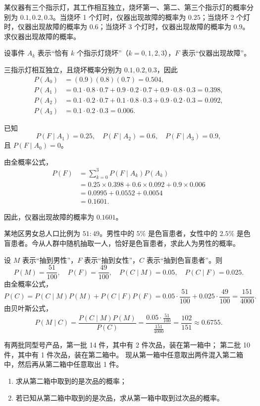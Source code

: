 \begin{exercise}
某仪器有三个指示灯，其工作相互独立，烧坏第一、第二、第三个指示灯的概率分别为 $0.1,0.2,0.3$。当烧坏 1 个灯时，仪器出现故障的概率为 $0.25$；当烧坏 2 个灯时，仪器出现故障的概率为 $0.6$；当烧坏 3 个灯时，仪器出现故障的概率为 $0.9$。求仪器出现故障的概率。
\end{exercise}
\begin{solution}
设事件 $A_k$ 表示“恰有 $k$ 个指示灯烧坏”（$k=0,1,2,3$），$F$ 表示“仪器出现故障”。

三指示灯相互独立，且烧坏概率分别为 $0.1,0.2,0.3$，因此
\[
\begin{aligned}
P(A_0)&=(0.9)(0.8)(0.7)=0.504,\\
P(A_1)&=0.1\cdot0.8\cdot0.7+0.9\cdot0.2\cdot0.7+0.9\cdot0.8\cdot0.3=0.398,\\
P(A_2)&=0.1\cdot0.2\cdot0.7+0.1\cdot0.8\cdot0.3+0.9\cdot0.2\cdot0.3=0.092,\\
P(A_3)&=0.1\cdot0.2\cdot0.3=0.006.
\end{aligned}
\]

已知
\[
P(F\mid A_1)=0.25,\quad P(F\mid A_2)=0.6,\quad P(F\mid A_3)=0.9,
\]
且 $P(F\mid A_0)=0$。

由全概率公式，
\[
\begin{aligned}
P(F)
&=\sum_{k=0}^3 P(F\mid A_k)P(A_k) \\
&=0.25\times 0.398 + 0.6\times 0.092 + 0.9\times 0.006 \\
&=0.0995+0.0552+0.0054 \\
&=0.1601.
\end{aligned}
\]

因此，仪器出现故障的概率为 $0.1601$。
\end{solution}
\begin{exercise}
某地区男女总人口比例为 $51:49$。男性中的 $5\%$ 是色盲患者，女性中的 $2.5\%$ 是色盲患者。今从人群中随机抽取一人，恰好是色盲患者，求此人为男性的概率。
\end{exercise}
\begin{solution}
设 $M$ 表示“抽到男性”，$F$ 表示“抽到女性”，$C$ 表示“抽到色盲患者”。则
\[
P(M)=\frac{51}{100},\quad P(F)=\frac{49}{100},\quad
P(C\mid M)=0.05,\quad P(C\mid F)=0.025.
\]
由全概率公式，
\[
P(C)=P(C\mid M)P(M)+P(C\mid F)P(F)
=0.05\cdot\frac{51}{100}+0.025\cdot\frac{49}{100}
=\frac{151}{4000}.
\]
由贝叶斯公式，
\[
P(M\mid C)=\frac{P(C\mid M)P(M)}{P(C)}
=\frac{0.05\cdot\frac{51}{100}}{\frac{151}{4000}}
=\frac{102}{151}\approx 0.6755.
\]
\end{solution}
\begin{exercise}
有两批同型号产品，第一批 14 件，其中有 2 件次品，装在第一箱中；
第二批 10 件，其中有 1 件次品，装在第二箱中。
现从第一箱中任意取出两件混入第二箱中，然后再从第二箱中任意取出 1 件。
\begin{enumerate}
  \item 求从第二箱中取到的是次品的概率；
  \item 若已知从第二箱中取到的是次品，求从第一箱中取到过次品的概率。
\end{enumerate}
\end{exercise}

